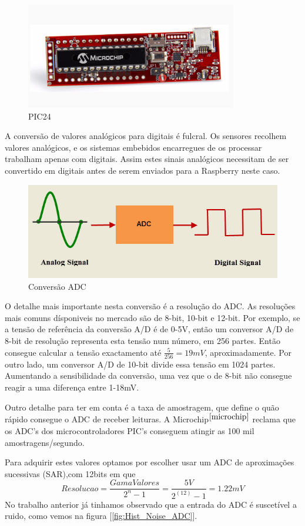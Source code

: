 \documentclass[12pt]{article}
\begin{document}
\begin{figure}[H]
        \centering
        \includegraphics[width=0.4\linewidth]{imgs/PIC24.png}
        \caption{PIC24}
        \label{fig:pic24}
\end{figure}

A conversão de valores analógicos para digitais é fulcral. Os sensores recolhem valores analógicos, e os sistemas embebidos encarregues de os processar trabalham apenas com digitais. Assim estes sinais analógicos necessitam de ser convertido em digitais antes de serem enviados para a Raspberry neste caso. 

\begin{figure}[H]
        \centering
        \includegraphics[width=0.4\linewidth]{imgs/ADC-Conversion.jpg}
        \caption{Conversão ADC}
        \label{fig:adc}
\end{figure}

\par O detalhe mais importante nesta conversão é a resolução do ADC. As resoluções mais comuns dísponiveis no mercado são de 8-bit, 10-bit e 12-bit. Por exemplo, se a tensão de referência da conversão A/D é de 0-5V, então um conversor A/D de 8-bit de resolução representa esta tensão num número, em 256 partes. Então consegue calcular a tensão exactamento até $\frac{5}{256} = 19 mV$, aproximadamente. Por outro lado, um conversor A/D de 10-bit divide essa tensão em 1024 partes. Aumentando a sensibilidade da conversão, uma vez que o de 8-bit não consegue reagir a uma diferença entre 1-18mV. \\
\par Outro detalhe para ter em conta é a taxa de amostragem, que define o quão rápido consegue o ADC de receber leituras. A Microchip$^{\cite{microchip}}$ reclama que os ADC's dos microcontroladores PIC's conseguem atingir as 100 mil amostragens/segundo.

Para adquirir estes valores optamos por escolher usar um ADC de aproximações sucessivas (SAR),com 12bits em que
\begin{equation}
    Resolucao = \frac{GamaValores}{2^n - 1} =\frac{5V}{2^(12) - 1} =1.22mV
\end{equation}
No trabalho anterior já tinhamos observado que a entrada do ADC é suscetível a ruido, como vemos na figura [\ref{fig:Hist_Noise_ADC}].\\
\end{document}
